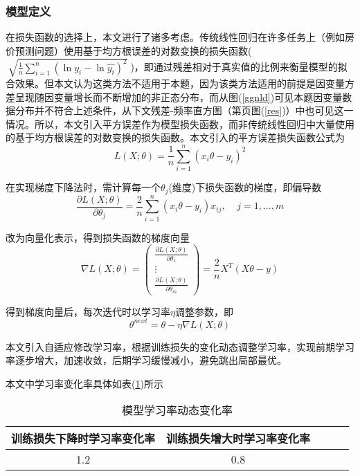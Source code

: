 \documentclass[withoutpreface,bwprint]{cumcmthesis}  %
\begin{document}
        \subsubsection{模型定义}
        \label{model_def}
        在损失函数的选择上，本文进行了诸多考虑。传统线性回归在许多任务上（例如房价预测问题）使用基于均方根误差的对数变换的损失函数($\;\sqrt{\frac{1}{n}\sum_{i=1}^{n} (\ln{y_i} -\ln{\hat{y_i} })^{2} }\;$)，即通过残差相对于真实值的比例来衡量模型的拟合效果。但本文认为这类方法不适用于本题，因为该类方法适用的前提是因变量方差呈现随因变量增长而不断增加的非正态分布，而从图(\ref{ggnld})可见本题因变量数据分布并不符合上述条件，从下文残差-频率直方图（第\pageref{res}页图(\ref{res})）中也可见这一情况。所以，本文引入平方误差作为模型损失函数，而非传统线性回归中大量使用的基于均方根误差的对数变换的损失函数。本文引入的平方误差损失函数公式为
        \begin{equation}
        L(X;\theta )=\frac{1}{n}\sum_{i=1}^{n}(x_{i}\theta-y_{i})^2
        \label{sq_loss}
        \end{equation}
        
        在实现梯度下降法时，需计算每一个$\theta_{j}$(维度)下损失函数的梯度，即偏导数
        \begin{equation}
        \frac{\partial L(X;\theta )}{\partial \theta_{j}}=\frac{2}{n} \sum_{i=1}^{n}(x_{i}\theta -y_{i})x_{ij},\;\;\;\;j=1,...,m
        \end{equation}

        改为向量化表示，得到损失函数的梯度向量
        \begin{equation}
        \nabla L(X;\theta )=\begin{pmatrix} \frac{\partial L(X;\theta )}{\partial \theta_{1}}\\ \vdots \\ \frac{\partial L(X;\theta )}{\partial \theta_{m}}\end{pmatrix}=\frac{2}{n} X^{T} (X\theta-y)
        \end{equation}

        得到梯度向量后，每次迭代时以学习率$\eta $调整参数，即
        \begin{equation}
        \theta ^{next}=\theta -\eta \nabla L(X;\theta)
        \end{equation}

        本文引入自适应修改学习率，根据训练损失的变化动态调整学习率，实现前期学习率逐步增大，加速收敛，后期学习缓慢减小，避免跳出局部最优。
        
        本文中学习率变化率具体如表(\ref{tab:lr})所示
        \vspace{16pt}
        \begin{table}[h] 
            \centering
            \caption{模型学习率动态变化率} 
            \begin{tabular}{ccccc}  
                \toprule  
                    训练损失下降时学习率变化率 & 训练损失增大时学习率变化率  \\  
                \midrule  
                    1.2 & 0.8   \\  
                \bottomrule  
            \end{tabular}  
            \label{tab:lr}
        \end{table} 
        
\end{document}

